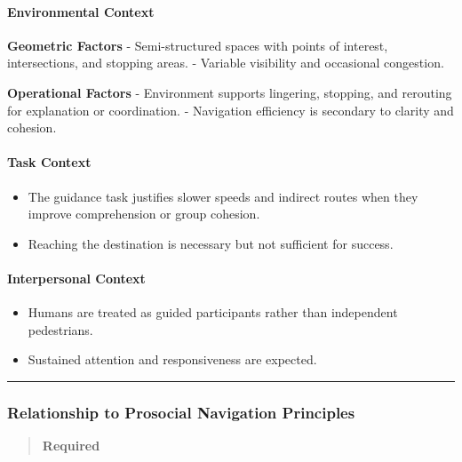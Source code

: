 \documentclass[utf8]{frontiers_suppmat} %
\providecommand{\tightlist}{%
  \setlength{\itemsep}{0pt}\setlength{\parskip}{0pt}}
\begin{document}
\paragraph{Environmental Context}\label{environmental-context}

\textbf{Geometric Factors} - Semi-structured spaces with points of
interest, intersections, and stopping areas. - Variable visibility and
occasional congestion.

\textbf{Operational Factors} - Environment supports lingering, stopping,
and rerouting for explanation or coordination. - Navigation efficiency
is secondary to clarity and cohesion.

\paragraph{Task Context}\label{task-context}

\begin{itemize}
\tightlist
\item
  The guidance task justifies slower speeds and indirect routes when
  they improve comprehension or group cohesion.
\item
  Reaching the destination is necessary but not sufficient for success.
\end{itemize}

\paragraph{Interpersonal Context}\label{interpersonal-context}

\begin{itemize}
\tightlist
\item
  Humans are treated as guided participants rather than independent
  pedestrians.
\item
  Sustained attention and responsiveness are expected.
\end{itemize}

\begin{center}\rule{0.5\linewidth}{0.5pt}\end{center}

\subsubsection{Relationship to Prosocial Navigation
Principles}\label{relationship-to-prosocial-navigation-principles}

\begin{quote}
\textbf{Required}
\end{quote}
\end{document}
